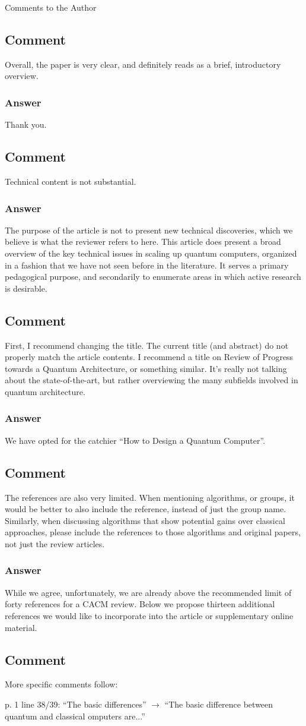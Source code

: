 \documentclass{article}
\newcommand{\comment}{\subsection{Comment}\em}
\newcommand{\answer}{\rm \subsubsection*{Answer}}
\begin{document}
Comments to the Author

\comment

Overall, the paper is very clear, and definitely reads as a brief,
introductory overview.

\answer

Thank you.

\comment

Technical content is not substantial.

\answer

The purpose of the article is not to present new technical
discoveries, which we believe is what the reviewer refers to here.
This article does present a broad overview of the key technical issues
in scaling up quantum computers, organized in a fashion that we have
not seen before in the literature.  It serves a primary pedagogical
purpose, and secondarily to enumerate areas in which active research
is desirable.

\comment

First, I recommend changing the title.  The current title (and
abstract) do not properly match the article contents.  I recommend a
title on Review of Progress towards a Quantum Architecture, or
something similar. It's really not talking about the state-of-the-art,
but rather overviewing the many subfields involved in quantum
architecture.

\answer

We have opted for the catchier ``How to Design a Quantum Computer''.

\comment

The references are also very limited.  When mentioning algorithms, or
groups, it would be better to also include the reference, instead of
just the group name.  Similarly, when discussing algorithms that show
potential gains over classical approaches, please include the
references to those algorithms and original papers, not just the
review articles.

\answer

While we agree, unfortunately, we are already above the recommended
limit of forty references for a CACM review.  Below we propose
thirteen additional references we would like to incorporate into the
article or supplementary online material.

\comment

More specific comments follow:

p. 1 line 38/39: ``The basic differences'' $\rightarrow$ ``The basic difference between quantum and classical omputers are...''
\end{document}
